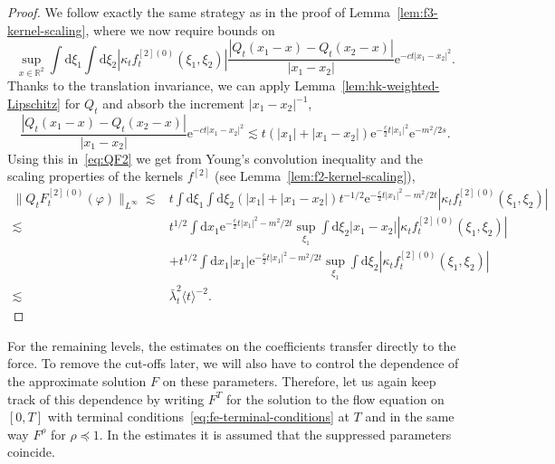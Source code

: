 \documentclass[11pt, a4paper]{scrartcl}
\numberwithin{equation}{section}
\theoremstyle{plain}
\theoremstyle{remark}
\newcommand{\mathd}{\mathrm{d}}
\newcommand{\mathe}{\mathrm{e}}
\begin{document}
\begin{proof}
  We follow exactly the same strategy as in the proof of
  Lemma~\ref{lem:f3-kernel-scaling}, where we now require bounds on
  \begin{equation}
    \sup_{x \in \mathbb{R}^2}  \int \mathd \xi_1 \int \mathd \xi_2 | \kappa_t
    f_t^{[2] (0)} (\xi_1, \xi_2) |  \frac{| Q_t (x_1 - x) - Q_t (x_2 - x) |}{|
    x_1 - x_2 |} \mathe^{- ct | x_1 - x_2 |^2} . \label{eq:QF2}
  \end{equation}
  Thanks to the translation invariance, we can apply
  Lemma~\ref{lem:hk-weighted-Lipschitz} for $Q_t$ and absorb the increment $|
  x_1 - x_2 |^{- 1}$,
  \begin{equation}
    \frac{| Q_t (x_1 - x) - Q_t (x_2 - x) |}{| x_1 - x_2 |} \mathe^{- ct | x_1
    - x_2 |^2} \lesssim t (| x_1 | + | x_1 - x_2 |) \mathe^{- \frac{c}{2} t |
    x_1 |^2} \mathe^{- m^2 / 2 s} . \label{eq:d12Q}
  \end{equation}
  Using this in~\eqref{eq:QF2} we get from Young's convolution inequality and
  the scaling properties of the kernels ${f}^{[2]}$ (see
  Lemma~\ref{lem:f2-kernel-scaling}),
  \begin{align*}
    \| Q_t F_t^{[2] (0)} (\varphi) \|_{L^{\infty}} \lesssim & t \int
    \mathd \xi_1 \int \mathd \xi_2 (| x_1 | + | x_1 - x_2 |) t^{- 1 / 2}
    \mathe^{- \frac{c}{2} t | x_1 |^2 - m^2 / 2 t} | \kappa_t f_t^{[2] (0)}
    (\xi_1, \xi_2) |\\
    \lesssim & t^{1 / 2} \int \mathd x_1 \mathe^{- \frac{c}{2} t | x_1
    |^2 - m^2 / 2 t} \sup_{\xi_1}  \int \mathd \xi_2 | x_1 - x_2 | | \kappa_t
    f_t^{[2] (0)} (\xi_1, \xi_2) |\\
    &+  t^{1 / 2} \int \mathd x_1 | x_1 | \mathe^{- \frac{c}{2} t | x_1
    |^2 - m^2 / 2 t} \sup_{\xi_1}  \int \mathd \xi_2 | \kappa_t f_t^{[2] (0)}
    (\xi_1, \xi_2) |\\
    \lesssim & \bar{\lambda}_t^2 \langle t \rangle^{- 2} .
  \end{align*}
  
\end{proof}

For the remaining levels, the estimates on the coefficients transfer directly
to the force. To remove the cut-offs later, we will also have to control the
dependence of the approximate solution $F$ on these parameters. Therefore, let
us again keep track of this dependence by writing $F^T$ for the solution to
the flow equation on $[0, T]$ with terminal
conditions~\eqref{eq:fe-terminal-conditions} at $T$ and in the same way
$F^{\rho}$ for $\rho \preceq  1$. In the estimates it is assumed that the
suppressed parameters coincide.
\end{document}
